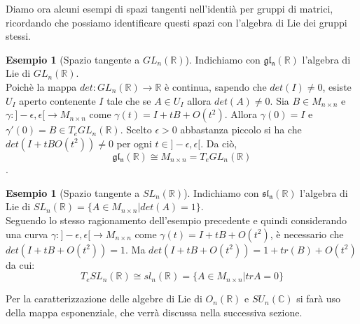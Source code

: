 \documentclass[12pt,a4paper]{report}
\theoremstyle{definition}
\theoremstyle{definition}
\newtheorem{Ex}[Def]{Esempio}
\theoremstyle{definition}
\theoremstyle{remark}
\begin{document}
Diamo ora alcuni esempi di spazi tangenti nell'identià per gruppi di matrici, ricordando che possiamo identificare questi spazi con l'algebra di Lie dei gruppi stessi.
\begin{Ex}[Spazio tangente a $GL_n(\mathbb{R})$]
	Indichiamo con $\mathfrak{gl_n(\mathbb{R})}$ l'algebra di Lie di $GL_n(\mathbb{R})$.
	\\
	Poichè la mappa $det:GL_n(\mathbb{R})\rightarrow\mathbb{R}$ è continua, sapendo che $det(I)\neq 0$, esiste $U_I$ aperto contenente $I$ tale che se $A\in U_I$ allora $det(A)\neq 0$. Sia $B\in M_{n\times n}$ e $\gamma:]-\epsilon,\epsilon[\rightarrow M_{n\times n}$ come $\gamma(t)=I+tB+O(t^2)$. Allora $\gamma(0)=I$ e $\gamma'(0)=B\in T_eGL_n(\mathbb{R})$. Scelto $\epsilon>0$ abbastanza piccolo si ha che $det(I+tBO(t^2))\neq 0$ per ogni $t\in]-\epsilon,\epsilon[$. Da ciò, $$\mathfrak{gl_n(\mathbb{R})}\cong M_{n\times n}= T_eGL_n(\mathbb{R})$$.
\end{Ex}
\begin{Ex}[Spazio tangente a $SL_n(\mathbb{R})$]
	Indichiamo con $\mathfrak{sl_n(\mathbb{R})}$ l'algebra di Lie di $SL_n(\mathbb{R})=\{A\in M_{n\times n}|det(A)=1\}$.\\
	Seguendo lo stesso ragionamento dell'esempio precedente e quindi considerando una curva $\gamma:]-\epsilon,\epsilon[\rightarrow M_{n\times n}$ come $\gamma(t)=I+tB+O(t^2)$, è necessario che $det(I+tB+O(t^2))=1$. Ma $det(I+tB+O(t^2))=1+tr(B)+O(t^2)$ da cui: $$T_eSL_n(\mathbb{R})\cong sl_n(\mathbb{R})=\{A\in M_{n\times n}|trA=0\}$$ 
\end{Ex}
Per la caratterizzazione delle algebre di Lie di $O_n(\mathbb{R})$ e $SU_n(\mathbb{C})$ si farà uso della mappa esponenziale, che verrà discussa nella successiva sezione.
\end{document}

